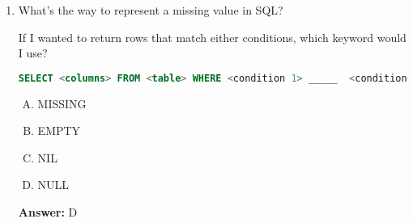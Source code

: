 \documentclass[12pt]{article}
\begin{document}
\begin{enumerate}[1.]
    \item

    What's the way to represent a missing value in SQL?

    \bigskip

    If I wanted to return rows that match either conditions, which keyword would I use?

    \bigskip

    \begin{lstlisting}[language=SQL]
    SELECT <columns> FROM <table> WHERE <condition 1> _____  <condition 2>;
    \end{lstlisting}

    \bigskip

    \begin{enumerate}[A.]
        \item MISSING
        \item EMPTY
        \item NIL
        \item NULL
    \end{enumerate}

    \bigskip

    \textbf{Answer:} D

\end{enumerate}
\end{document}
